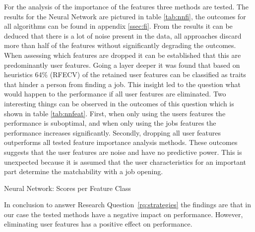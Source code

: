 For the analysis of the importance of the features three methods are tested. 
The results for the Neural Network are pictured in table \ref{tab:nnfi}, the outcomes for all algorithms can be found in appendix \ref{ssec:fi}.
From the results it can be deduced that there is a lot of noise present in the data, all approaches discard more than half of the features without significantly degrading the outcomes.
When assessing which features are dropped it can be established that this are predominantly user features.
Going a layer deeper it was found that based on heuristics 64\% (RFECV) of the retained user features can be classified as traits that hinder a person from finding a job. 
This insight led to the question what would happen to the performance if all user features are eliminated.
Two interesting things can be observed in the outcomes of this question which is shown in table \ref{tab:nnfeat}.
First, when only using the users features the performance is suboptimal, and when only using the jobs features the performance increases significantly.
Secondly, dropping all user features outperforms all tested feature importance analysis methods.
These outcomes suggests that the user features are noise and have no predictive power.
This is unexpected because it is assumed that the user characteristics for an important part determine the matchability with a job opening.

\begin{table}[h]
\begin{footnotesize}

\end{footnotesize}
\caption{\label{tab:nnfeat} \footnotesize{Neural Network: Scores per Feature Class}}
\end{table}

In conclusion to answer Research Question~\ref{rq:strategies} the findings are that in our case the tested methods have a negative impact on performance.
However, eliminating user features has a positive effect on performance.

